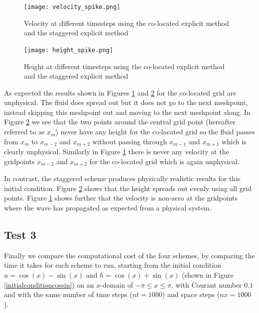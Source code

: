 \documentclass[a4paper,12pt, notitlepage]{article}
\begin{document}
\begin{figure} [H]
	\begin{center}
	\begin{minipage}{.6\textwidth}
		\ContinuedFloat*
		\captionsetup{width=1.5\textwidth}
		\captionsetup{justification=centering}
		\texttt{[image: velocity\_spike.png]}
		\caption{\label{velocity_spike} Velocity at different timesteps using the co-located explicit method and the staggered explicit method} 
	\end{minipage}
\end{center}
\end{figure}
\begin{figure}[H]
	\begin{center}
	\begin{minipage}{.6\textwidth}
		\ContinuedFloat
		\captionsetup{width=1.5\textwidth}
		\captionsetup{justification=centering}
		\texttt{[image: height\_spike.png]}
		\caption{\label{height_spike} Height at different timesteps using the co-located explicit method and the staggered explicit method} 
	\end{minipage}
\end{center}
\end{figure}

As expected the results shown in Figures \ref{velocity_spike} and \ref{height_spike} for the co-located grid are unphysical. The fluid does spread out but it does not go to the next meshpoint, instead skipping this meshpoint out and moving to the next meshpoint along. In Figure \ref{height_spike} we see that the two points around the central grid point (hereafter referred to as $x_{m}$) never have any height for the co-located grid so the fluid passes from $x_{m}$ to $x_{m-2}$ and $x_{m+ 2}$ without passing through $x_{m-1}$ and $x_{m+1}$ which is clearly unphysical. Similarly in Figure \ref{velocity_spike} there is never any velocity at the gridpoints $x_{m-2}$ and $x_{m+2}$ for the co-located grid which is again unphysical. 

In contrast, the staggered scheme produces physically realistic results for this initial condition. Figure \ref{height_spike} shows that the height spreads out evenly using all grid points. Figure \ref{velocity_spike} shows further that the velocity is non-zero at the gridpoints where the wave has propagated as expected from a physical system.


\subsection{Test 3}
Finally we compare the computational cost of the four schemes, by comparing the time it takes for each scheme to run, starting from the initial condition $u = \cos(x) - \sin(x)$ and $h = \cos(x) + \sin(x)$ (shown in Figure \ref{initialconditioncossin}) on an $x$-domain of $-\pi \leq x \leq \pi$, with Courant number $0.1$ and with the same number of time steps ($nt = 1000$) and space steps ($nx = 1000$).
\end{document}
